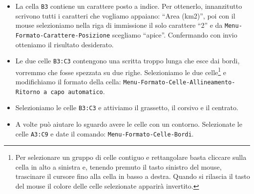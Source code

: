 \salvare


\begin{itemize} [noitemsep]
\item
La cella \texttt{B3} contiene un carattere posto a indice. Per ottenerlo,
innanzitutto scrivono tutti i caratteri che vogliamo appaiano:
``Area (km2)'', poi con il mouse selezioniamo nella riga di immissione
il solo carattere ``2'' e da \texttt{Menu-Formato-Carattere-Posizione} scegliamo
``apice''. Confermando con invio otteniamo il risultato desiderato.
\item 
Le due celle \texttt{B3:C3} contengono una scritta troppo lunga che esce dai 
bordi, vorremmo che fosse spezzata su due righe. 
Selezioniamo le due celle\footnote{
Per selezionare un gruppo di celle contiguo e rettangolare basta cliccare
sulla cella in alto a sinistra e, tenendo premuto il tasto sinistro del
mouse, trascinare il cursore fino alla cella in basso a destra.
Quando si rilascia il tasto del mouse il colore delle celle selezionate
apparirà invertito.} 
e modifichiamo il formato della cella:
\texttt{Menu-Formato-Celle-Allineamento-Ritorno a capo automatico}.
\item 
Selezioniamo le celle \texttt{B3:C3} e attiviamo il grassetto, il corsivo e 
il centrato.
\item
A volte può aiutare lo sguardo avere le celle con un contorno. Selezionate le 
celle \texttt{A3:C9} e date il comando: \texttt{Menu-Formato-Celle-Bordi}.
\end{itemize}

